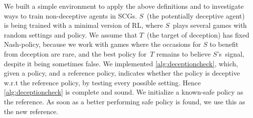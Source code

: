 \documentclass[submission,publicdomain,creativecommons noncommercial]{eptcs}
\begin{document}
We built a simple environment to apply the above definitions and to investigate ways to train non-deceptive agents in SCGs. %
$S$~(the potentially deceptive agent) is being trained with a minimal version of RL, where $S$~plays several games with random settings and policy. %
We assume that $T$~(the target of deception) has fixed Nash-policy, because we work with games where the occasions for $S$ to benefit from deception are rare, and the best policy for~$T$ remains to believe $S$'s~signal, despite it being sometimes false.
We implemented \cref{alg:deceptioncheck}, which, given a policy, and a reference policy, indicates whether the policy is deceptive w.r.t the reference policy, by testing every possible setting. Hence \cref{alg:deceptioncheck} is complete and sound. 
We initialize a known-safe policy  as the reference. As soon as a better performing safe policy is found, we use this as the new reference. 
\end{document}

